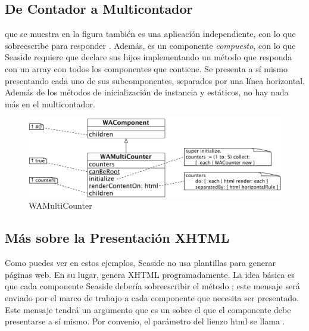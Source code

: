 \documentclass[a4paper,10pt,twoside]{book}
\begin{document}
\subsection{De Contador a Multicontador}

 que se muestra en la figura  también es una aplicación independiente, con lo que sobreescribe  para responder .
Además, es un componente \emph{compuesto}, con lo que Seaside requiere que declare sus hijos implementando un método  que responda con un array con todos los componentes que contiene.
Se presenta a sí mismo presentando cada uno de sus subcomponentes, separados por una línea horizontal.
Además de los métodos de inicialización de instancia y estáticos, no hay nada más en el multicontador.

\begin{figure}[bht]
\begin{center}
\includegraphics[width=\textwidth]{WAMultiCounter}
\caption{WAMultiCounter}
\end{center}
\end{figure}

\subsection{Más sobre la Presentación XHTML}

Como puedes ver en estos ejemplos, Seaside no usa plantillas para generar páginas web.
En su lugar, genera XHTML programadamente.
La idea básica es que cada componente Seaside debería sobreescribir el método ; este mensaje será enviado por el marco de trabajo a cada componente que necesita ser presentado.
Este mensaje  tendrá un argumento que es un   sobre el que el componente debe presentarse a sí mismo. Por convenio, el parámetro del lienzo html se llama .
\end{document}
